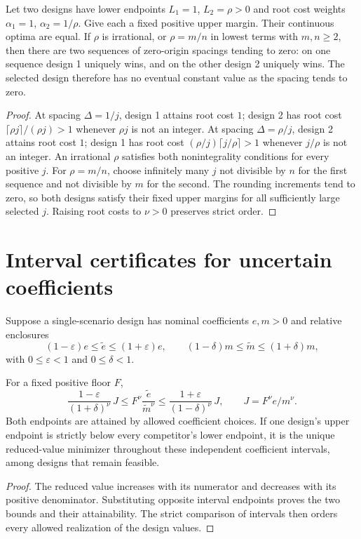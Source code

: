 \documentclass[11pt,a4paper]{article}
\begin{document}
\begin{proposition}\label{prop:persistent}
Let two designs have lower endpoints $L_1=1$, $L_2=\rho>0$ and root cost
weights $\alpha_1=1$, $\alpha_2=1/\rho$. Give each a fixed positive
upper margin. Their continuous optima are equal.
If $\rho$ is irrational, or $\rho=m/n$ in lowest terms with $m,n\ge2$,
then there are two sequences of zero-origin spacings tending to zero:
on one sequence design 1 uniquely wins, and on the other design 2 uniquely
wins. The selected design therefore has no eventual constant value as
the spacing tends to zero.
\end{proposition}
\begin{proof}
At spacing $\Delta=1/j$, design 1 attains root cost $1$; design 2 has
root cost $\lceil\rho j\rceil/(\rho j)>1$ whenever $\rho j$ is not
an integer. At spacing $\Delta=\rho/j$, design 2 attains root cost $1$;
design 1 has root cost $(\rho/j)\lceil j/\rho\rceil>1$ whenever
$j/\rho$ is not an integer. An irrational $\rho$ satisfies both
nonintegrality conditions for every positive $j$. For $\rho=m/n$, choose
infinitely many $j$ not divisible by $n$ for the first sequence and not
divisible by $m$ for the second. The rounding increments tend to zero,
so both designs satisfy their fixed upper margins for all sufficiently
large selected $j$. Raising root costs to $\nu>0$ preserves strict order.
\end{proof}


\section{Interval certificates for uncertain coefficients}
Suppose a single-scenario design has nominal coefficients $e,m>0$ and
relative enclosures
\[
 (1-\varepsilon)e\le\widetilde e\le(1+\varepsilon)e,\qquad
 (1-\delta)m\le\widetilde m\le(1+\delta)m,
\]
with $0\le\varepsilon<1$ and $0\le\delta<1$.

\begin{proposition}\label{prop:interval}
For a fixed positive floor $F$,
\begin{equation}\label{eq:uncertain}
 \frac{1-\varepsilon}{(1+\delta)^\nu}\,J
 \le F^\nu\frac{\widetilde e}{\widetilde m^\nu}
 \le\frac{1+\varepsilon}{(1-\delta)^\nu}\,J,
 \qquad J=F^\nu e/m^\nu.
\end{equation}
Both endpoints are attained by allowed coefficient choices.
If one design's upper endpoint is strictly below every competitor's lower
endpoint, it is the unique reduced-value minimizer throughout these
independent coefficient intervals, among designs that remain feasible.
\end{proposition}
\begin{proof}
The reduced value increases with its numerator and decreases with its
positive denominator. Substituting opposite interval endpoints proves the
two bounds and their attainability. The strict comparison of intervals
then orders every allowed realization of the design values.
\end{proof}
\end{document}
